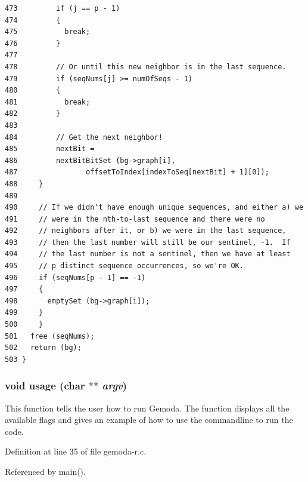 \begin{verbatim}
473         if (j == p - 1)
474         {
475           break;
476         }
477       
478         // Or until this new neighbor is in the last sequence.
479         if (seqNums[j] >= numOfSeqs - 1)
480         {
481           break;
482         }
483       
484         // Get the next neighbor!
485         nextBit =
486         nextBitBitSet (bg->graph[i],
487                offsetToIndex[indexToSeq[nextBit] + 1][0]);
488     }
489       
490     // If we didn't have enough unique sequences, and either a) we
491     // were in the nth-to-last sequence and there were no 
492     // neighbors after it, or b) we were in the last sequence,
493     // then the last number will still be our sentinel, -1.  If
494     // the last number is not a sentinel, then we have at least
495     // p distinct sequence occurrences, so we're OK.
496     if (seqNums[p - 1] == -1)
497     {
498       emptySet (bg->graph[i]);
499     }
500     }
501   free (seqNums);
502   return (bg);
503 }
\end{verbatim}
\normalsize 


\hypertarget{gemoda-r_8c_a0}{
\subsubsection[usage]{\setlength{\rightskip}{0pt plus 5cm}void usage (char $\ast$$\ast$ {\em argv})}}
\label{gemoda-r_8c_a0}


This function tells the user how to run Gemoda. The function displays all the available flags and gives an example of how to use the commandline to run the code.

Definition at line 35 of file gemoda-r.c.

Referenced by main().

